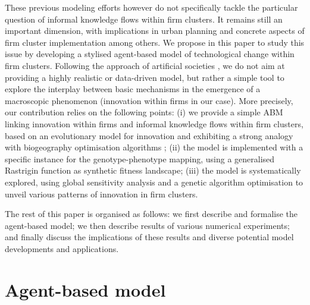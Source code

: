 \documentclass[letterpaper]{article}
\begin{document}
These previous modeling efforts however do not specifically tackle the particular question of informal knowledge flows within firm clusters. It remains still an important dimension, with implications in urban planning and concrete aspects of firm cluster implementation among others. We propose in this paper to study this issue by developing a stylised agent-based model of technological change within firm clusters. Following the approach of artificial societies \citep{epstein1997artificial}, we do not aim at providing a highly realistic or data-driven model, but rather a simple tool to explore the interplay between basic mechanisms in the emergence of a macroscopic phenomenon (innovation within firms in our case). More precisely, our contribution relies on the following points: (i) we provide a simple ABM linking innovation within firms and informal knowledge flows within firm clusters, based on an evolutionary model for innovation and exhibiting a strong analogy with biogeography optimisation algorithms \citep{simon2008biogeography}; (ii) the model is implemented with a specific instance for the genotype-phenotype mapping, using a generalised Rastrigin function as synthetic fitness landscape; (iii) the model is systematically explored, using global sensitivity analysis and a genetic algorithm optimisation to unveil various patterns of innovation in firm clusters.

The rest of this paper is organised as follows: we first describe and formalise the agent-based model; we then describe results of various numerical experiments; and finally discuss the implications of these results and diverse potential model developments and applications.


\section{Agent-based model}


\end{document}
